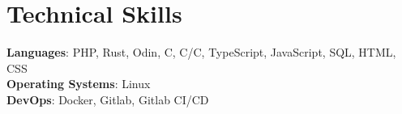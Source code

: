 \documentclass{article}
\newcommand{\CS}{C\nolinebreak\hspace{-.05em}\raisebox{.6ex}{\scriptsize\bf \#}}
\newcommand{\CC}{C\nolinebreak\hspace{-.05em}\raisebox{.4ex}{\tiny\bf +}\nolinebreak\hspace{-.10em}\raisebox{.4ex}{\tiny\bf +}}
\def\CC{{C\nolinebreak[4]\hspace{-.05em}\raisebox{.4ex}{\tiny\bf ++}}}
\begin{document}
\section{Technical Skills}
 \begin{itemize}[leftmargin=0.15in, label={}]
    \small{\item{
     \textbf{Languages}{: PHP, Rust, Odin, \CS, C/\CC, TypeScript, JavaScript, SQL, HTML, CSS} \\
     \textbf{Operating Systems}{: Linux} \\
     \textbf{DevOps}{: Docker, Gitlab, Gitlab CI/CD}
    }}
 \end{itemize}

\end{document}
